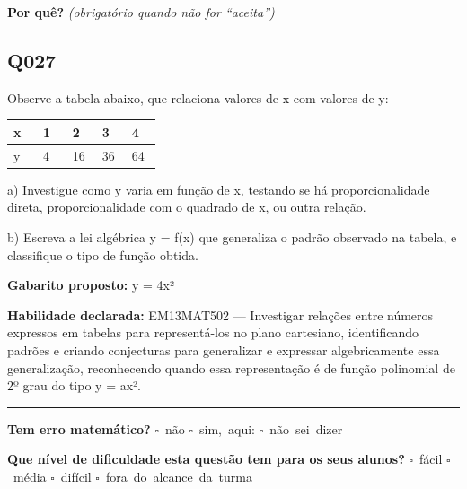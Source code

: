 \documentclass[11pt,a4paper]{article}
\begin{document}
\textbf{Por quê?} \emph{(obrigatório quando não for ``aceita'')}

\underline{\hspace{\linewidth}}

\underline{\hspace{\linewidth}}
\vspace{0.6em}

\begin{samepage}
\subsection*{Q027}
Observe a tabela abaixo, que relaciona valores de x com valores de y:

\begin{center}
\begin{tabular}{|p{0.172\linewidth}|p{0.172\linewidth}|p{0.172\linewidth}|p{0.172\linewidth}|p{0.172\linewidth}|}
\hline
\textbf{x} & \textbf{1} & \textbf{2} & \textbf{3} & \textbf{4} \\
\hline
y & 4 & 16 & 36 & 64 \\
\hline
\end{tabular}
\end{center}

a) Investigue como y varia em função de x, testando se há proporcionalidade direta, proporcionalidade com o quadrado de x, ou outra relação.

b) Escreva a lei algébrica y = f(x) que generaliza o padrão observado na tabela, e classifique o tipo de função obtida.

\textbf{Gabarito proposto:} y = 4x²

\textbf{Habilidade declarada:} EM13MAT502 --- Investigar relações entre números expressos em tabelas para representá-los no plano cartesiano, identificando padrões e criando conjecturas para generalizar e expressar algebricamente essa generalização, reconhecendo quando essa representação é de função polinomial de 2º grau do tipo y = ax².
\end{samepage}

\noindent\rule{\linewidth}{0.4pt}
\textbf{Tem erro matemático?}\quad
\mbox{$\square$~não} \quad \mbox{$\square$~sim, aqui:} \underline{\hspace{5cm}}
\quad \mbox{$\square$~não sei dizer}

\textbf{Que nível de dificuldade esta questão tem para os seus alunos?}\quad
\mbox{$\square$~fácil} \quad \mbox{$\square$~média} \quad
\mbox{$\square$~difícil} \quad \mbox{$\square$~fora do alcance da turma}
\end{document}

